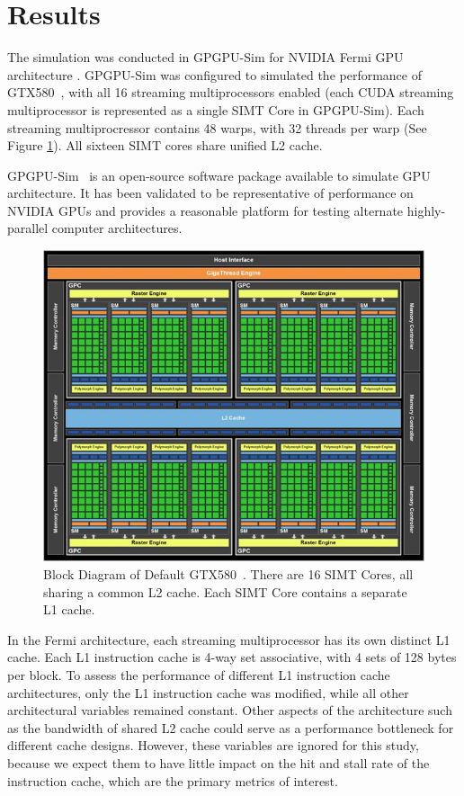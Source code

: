 \section{Results}

The simulation was conducted in GPGPU-Sim for NVIDIA Fermi GPU
architecture \cite{bakhodayuan09}. 
GPGPU-Sim was configured to simulated the performance of
GTX580~\cite{gf100}, with all 16 streaming multiprocessors enabled
(each CUDA streaming multiprocessor is represented as a single SIMT
Core in GPGPU-Sim). 
Each streaming multiprocressor contains 48 warps, with 32 threads per
warp (See Figure \ref{GTX580}). 
All sixteen SIMT cores share unified L2 cache.

GPGPU-Sim~\cite{bakhodayuan09} is an open-source software package
available to simulate GPU architecture. 
It has been validated to be representative of performance on NVIDIA
GPUs and provides a reasonable platform for testing alternate
highly-parallel computer architectures.

\begin{figure}[ht!]
\centering
\includegraphics[width=\columnwidth]{graphics/GTX580.jpg}
\caption{Block Diagram of Default GTX580~\cite{gf100}. There are 16 SIMT Cores, all sharing a common L2 cache. Each SIMT Core contains a separate L1 cache.}
\label{GTX580}
\end{figure}

In the Fermi architecture, each streaming multiprocessor has
its own distinct L1 cache. 
Each L1 instruction cache is 4-way set associative, with 4 sets of
128 bytes per block. 
To assess the  performance of different L1 instruction cache
architectures, only the L1 instruction cache was modified, while all
other architectural variables remained constant. 
Other aspects of the architecture such as the bandwidth of shared L2
cache could serve as a performance bottleneck for different cache
designs. 
However, these variables are ignored for this study, because we expect
them to have little impact on the hit and stall rate of the
instruction cache, which are the primary metrics of interest.

